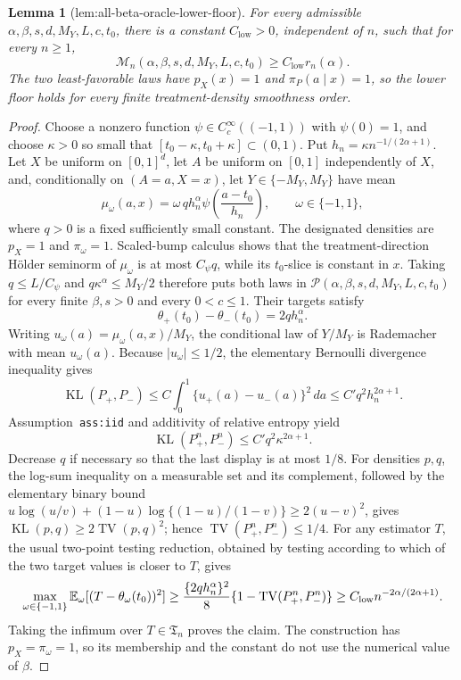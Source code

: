 \documentclass{article}
\newtheorem{lemma}{Lemma}
\begin{document}
\begin{lemma}[lem:all-beta-oracle-lower-floor]\label{lem:all-beta-oracle-lower-floor}
For every admissible \(\alpha,\beta,s,d,M_Y,L,c,t_0\), there is a constant \(C_{\mathrm{low}}>0\), independent of \(n\), such that for every \(n\ge1\),
\[
\mathcal M_n(\alpha,\beta,s,d,M_Y,L,c,t_0)\ge C_{\mathrm{low}}r_n(\alpha).
\]
The two least-favorable laws have \(p_X(x)=1\) and \(\pi_P(a\mid x)=1\), so the lower floor holds for every finite treatment-density smoothness order.
\end{lemma}
\begin{proof}
Choose a nonzero function \(\psi\in C_c^\infty((-1,1))\) with \(\psi(0)=1\), and choose \(\kappa>0\) so small that \([t_0-\kappa,t_0+\kappa]\subset(0,1)\). Put \(h_n=\kappa n^{-1/(2\alpha+1)}\). Let \(X\) be uniform on \([0,1]^d\), let \(A\) be uniform on \([0,1]\) independently of \(X\), and, conditionally on \((A=a,X=x)\), let \(Y\in\{-M_Y,M_Y\}\) have mean
\[
\mu_\omega(a,x)=\omega\,q h_n^\alpha\psi\!\left(\frac{a-t_0}{h_n}\right),\qquad \omega\in\{-1,1\},
\]
where \(q>0\) is a fixed sufficiently small constant. The designated densities are \(p_X=1\) and \(\pi_\omega=1\). Scaled-bump calculus shows that the treatment-direction H\"older seminorm of \(\mu_\omega\) is at most \(C_\psi q\), while its \(t_0\)-slice is constant in \(x\). Taking \(q\le L/C_\psi\) and \(q\kappa^\alpha\le M_Y/2\) therefore puts both laws in \(\mathcal P(\alpha,\beta,s,d,M_Y,L,c,t_0)\) for every finite \(\beta,s>0\) and every \(0<c\le1\). Their targets satisfy
\[
\theta_+(t_0)-\theta_-(t_0)=2q h_n^\alpha.
\]
Writing \(u_\omega(a)=\mu_\omega(a,x)/M_Y\), the conditional law of \(Y/M_Y\) is Rademacher with mean \(u_\omega(a)\). Because \(\lvert u_\omega\rvert\le1/2\), the elementary Bernoulli divergence inequality gives
\[
\operatorname{KL}(P_+,P_-)
\le C\int_0^1\{u_+(a)-u_-(a)\}^2\,da
\le C' q^2 h_n^{2\alpha+1}.
\]
Assumption~\texttt{ass:iid} and additivity of relative entropy yield
\[
\operatorname{KL}(P_+^n,P_-^n)\le C'q^2\kappa^{2\alpha+1}.
\]
Decrease \(q\) if necessary so that the last display is at most \(1/8\). For densities \(p,q\), the log-sum inequality on a measurable set and its complement, followed by the elementary binary bound \(u\log(u/v)+(1-u)\log\{(1-u)/(1-v)\}\ge2(u-v)^2\), gives \(\operatorname{KL}(p,q)\ge2\operatorname{TV}(p,q)^2\); hence \(\operatorname{TV}(P_+^n,P_-^n)\le1/4\). For any estimator \(T\), the usual two-point testing reduction, obtained by testing according to which of the two target values is closer to \(T\), gives
\[
\makebox[\linewidth][c]{\resizebox{0.98\linewidth}{!}{\(\displaystyle \max_{\omega\in\{-1,1\}}\mathbb E_\omega[(T-\theta_\omega(t_0))^2]
\ge \frac{\{2q h_n^\alpha\}^2}{8}\{1-\operatorname{TV}(P_+^n,P_-^n)\}
\ge C_{\mathrm{low}}n^{-2\alpha/(2\alpha+1)}.\)}}
\]
Taking the infimum over \(T\in\mathfrak T_n\) proves the claim. The construction has \(p_X=\pi_\omega=1\), so its membership and the constant do not use the numerical value of \(\beta\).
\end{proof}
\end{document}
